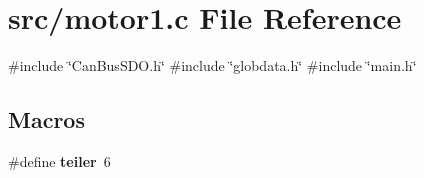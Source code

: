 \section{src/motor1.c File Reference}
\label{motor1_8c}
{\ttfamily \#include \char`\"{}Can\+Bus\+S\+D\+O.\+h\char`\"{}}\newline
{\ttfamily \#include \char`\"{}globdata.\+h\char`\"{}}\newline
{\ttfamily \#include \char`\"{}main.\+h\char`\"{}}\newline
\subsection*{Macros}
\begin{DoxyCompactItemize}
\item 
\#define \textbf{ teiler}~6
\end{DoxyCompactItemize}
